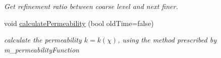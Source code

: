 \begin{DoxyCompactItemize}
\begin{DoxyCompactList}\small\item\em Get refinement ratio between coarse level and next finer. \end{DoxyCompactList}\item 
\hypertarget{classamr_mushy_layer_a40517f3a8938e0d6f419c3ded3bdd593}{void \hyperlink{classamr_mushy_layer_a40517f3a8938e0d6f419c3ded3bdd593}{calculate\-Permeability} (bool old\-Time=false)}\label{classamr_mushy_layer_a40517f3a8938e0d6f419c3ded3bdd593}

\begin{DoxyCompactList}\small\item\em calculate the permeability $ k=k(\chi) $, using the method prescribed by m\-\_\-permeability\-Function \end{DoxyCompactList}\end{DoxyCompactItemize}
